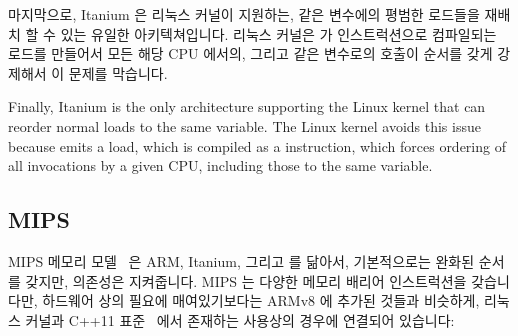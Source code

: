 마지막으로, Itanium 은 리눅스 커널이 지원하는, 같은 변수에의 평범한 로드들을
재배치 할 수 있는 유일한 아키텍쳐입니다.
리눅스 커널은  가  인스트럭션으로 컴파일되는
 로드를 만들어서 모든 해당 CPU 에서의, 그리고 같은 변수로의
 호출이 순서를 갖게 강제해서 이 문제를 막습니다.

Finally, Itanium is the only architecture supporting the Linux kernel
that can reorder normal loads to the same variable.
The Linux kernel avoids this issue because  emits
a  load, which is compiled as a  instruction,
which forces ordering of all  invocations by a given
CPU, including those to the same variable.

\subsection{MIPS}

MIPS 메모리 모델~\cite[page~479]{MIPSvII-A-2017} 은 ARM, Itanium, 그리고
\Power{} 를 닮아서, 기본적으로는 완화된 순서를 갖지만, 의존성은 지켜줍니다.
MIPS 는 다양한 메모리 배리어 인스트럭션을 갖습니다만, 하드웨어 상의 필요에
매여있기보다는 ARMv8 에 추가된 것들과 비슷하게, 리눅스 커널과 C++11
표준~\cite{RichardSmith2015N4527} 에서 존재하는 사용상의 경우에 연결되어
있습니다:

